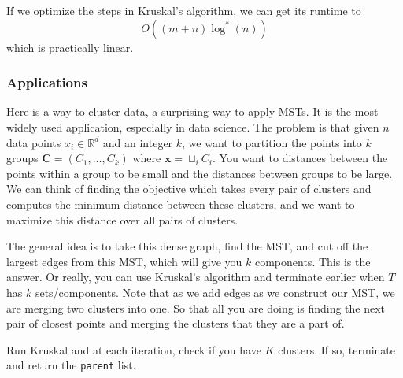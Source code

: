     If we optimize the steps in Kruskal's algorithm, we can get its runtime to 
    \begin{equation}
      O((m + n) \log^{\ast} (n))
    \end{equation}
    which is practically linear. 

  \subsubsection{Applications}

    Here is a way to cluster data, a surprising way to apply MSTs. It is the most widely used application, especially in data science. The problem is that given $n$ data points $x_i \in \mathbb{R}^d$ and an integer $k$, we want to partition the points into $k$ groups $\mathbf{C} = (C_1, \ldots, C_k)$ where $\mathbf{x} = \sqcup_i C_i$. You want to distances between the points within a group to be small and the distances between groups to be large. We can think of finding the objective which takes every pair of clusters and computes the minimum distance between these clusters, and we want to maximize this distance over all pairs of clusters.  

    \begin{algo}
      The general idea is to take this dense graph, find the MST, and cut off the largest edges from this MST, which will give you $k$ components. This is the answer. Or really, you can use Kruskal's algorithm and terminate earlier when $T$ has $k$ sets/components. 
      Note that as we add edges as we construct our MST, we are merging two clusters into one. So that all you are doing is finding the next pair of closest points and merging the clusters that they are a part of. 

      \begin{algorithm}[H]
        \label{alg:clustering}
        \begin{algorithmic}[1]
            \State Run Kruskal and at each iteration, check if you have $K$ clusters. 
            \State If so, terminate and return the \texttt{parent} list. 
          \EndFunction
        \end{algorithmic}
      \end{algorithm}
    \end{algo}

